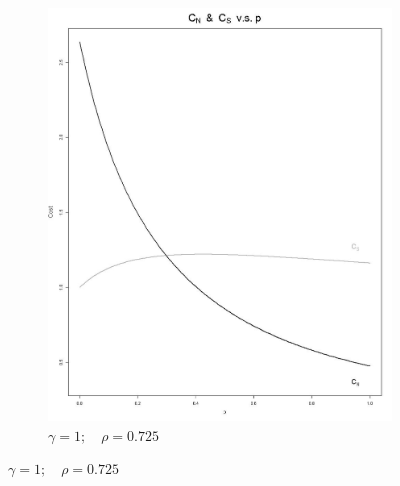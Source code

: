 \documentclass[11pt]{article}
\numberwithin{equation}{section}
\begin{document}
\begin{figure}[h!]
\begin{subfigure}[b]{0.49\textwidth}
	\includegraphics[width=\textwidth]{plots/cost_vs_p_1_0_725.png}
		\caption{$\gamma=1;\quad\rho=0.725$}
		\label{cost_vs_p_1_0_725}
	\end{subfigure}
          

\end{figure}
\end{document}

